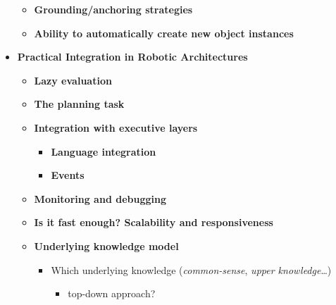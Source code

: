 \documentclass[a4paper]{article}
\begin{document}
\begin{itemize}
\begin{itemize}
        \item{\bf Grounding/anchoring strategies}

        \item{\bf Ability to automatically create new object instances}
    \end{itemize}

\item{\bf Practical Integration in Robotic Architectures}

    \begin{itemize}
        \item{\bf Lazy evaluation}

        \item{\bf The planning task}

        \item{\bf Integration with executive layers}

        \begin{itemize}
            \item{\bf Language integration}
            \item{\bf Events}
        \end{itemize}
        
        \item{\bf Monitoring and debugging}

        \item{\bf Is it fast enough? Scalability and responsiveness}
    \end{itemize}

\begin{itemize}
    \item{\bf Underlying knowledge model}

    \begin{itemize}
        \item  Which underlying knowledge (\emph{common-sense}, \emph{upper knowledge}\ldots{})
        \begin{itemize}
            \item  top-down approach?
        \end{itemize}

    \end{itemize}
\end{itemize}
\end{itemize}



\end{document}
